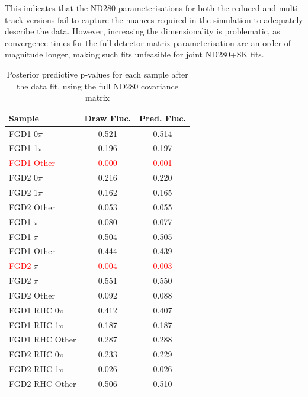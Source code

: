 This indicates that the ND280 parameterisations for both the reduced and multi-track versions fail to capture the nuances required in the simulation to adequately describe the data. However, increasing the dimensionality is problematic, as convergence times for the full detector matrix parameterisation are an order of magnitude longer, making such fits unfeasible for joint ND280+SK fits. 
\begin{table}[h]
	\centering
	\begin{tabular}{l | c c }
		\hline \hline
		Sample & Draw Fluc. & Pred. Fluc. \\
		\hline
		FGD1 0$\pi$ & 0.521 & 0.514 \\
		FGD1 1$\pi$ & 0.196 & 0.197 \\
		\textcolor{red}{FGD1 Other}  & \textcolor{red}{0.000} & \textcolor{red}{0.001} \\
		\hline
		FGD2 0$\pi$ & 0.216 & 0.220 \\
		FGD2 1$\pi$ & 0.162 & 0.165 \\
		FGD2 Other  & 0.053 & 0.055 \\
		\hline
		FGD1 \numubar 0$\pi$ & 0.080 & 0.077 \\
		FGD1 \numubar 1$\pi$ & 0.504 & 0.505 \\
		FGD1 \numubar Other  & 0.444 & 0.439 \\
		\hline
		\textcolor{red}{FGD2} \numubar 0$\pi$ & \textcolor{red}{0.004} & \textcolor{red}{0.003} \\
		FGD2 \numubar 1$\pi$ & 0.551 & 0.550 \\
		FGD2 \numubar Other  & 0.092 & 0.088 \\
		\hline
		FGD1 \numu RHC 0$\pi$ & 0.412 & 0.407 \\
		FGD1 \numu RHC 1$\pi$ & 0.187 & 0.187 \\
		FGD1 \numu RHC Other  & 0.287 & 0.288 \\
		\hline
		FGD2 \numu RHC 0$\pi$ & 0.233 & 0.229 \\
		FGD2 \numu RHC 1$\pi$ & 0.026 & 0.026 \\
		FGD2 \numu RHC Other  & 0.506 & 0.510 \\
		\hline
		\hline
	\end{tabular}
	\caption{Posterior predictive p-values for each sample after the data fit, using the full ND280 covariance matrix}
	\label{tab:data_post_pvalue_fullcov_2018}
\end{table}

